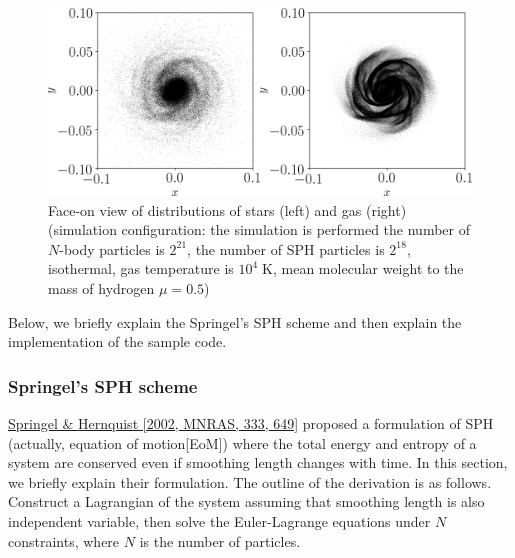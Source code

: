 \begin{figure}[h]
\centering
\includegraphics[width=\linewidth]{./fig/nbodysph_t046.png}
\caption{Face-on view of distributions of stars (left) and gas (right) (simulation configuration: the simulation is performed the number of $N$-body particles is $2^{21}$, the number of SPH particles is $2^{18}$, isothermal, gas temperature is $10^{4}\;\mathrm{K}$, mean molecular weight to the mass of hydrogen $\mu=0.5$)}
\label{fig:nbodysph}
\end{figure}


Below, we briefly explain the Springel's SPH scheme and then explain the implementation of the sample code.


\subsubsection{Springel's SPH scheme}
\label{subsubsec:Springel_scheme}
\href{https://doi.org/10.1046/j.1365-8711.2002.05445.x}{Springel \& Hernquist [2002, MNRAS, 333, 649]} proposed a formulation of SPH (actually, equation of motion[EoM]) where the total energy and entropy of a system are conserved even if smoothing length changes with time. In this section, we briefly explain their formulation. The outline of the derivation is as follows. Construct a Lagrangian of the system assuming that smoothing length is also independent variable, then solve the Euler-Lagrange equations under $N$ constraints, where $N$ is the number of particles.

